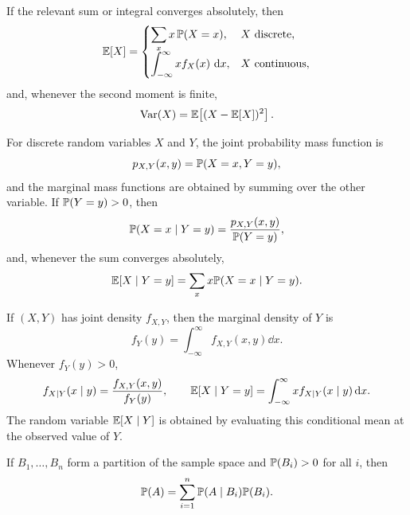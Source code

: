     \begin{definition}
        If the relevant sum or integral converges absolutely, then
        \[
            \mathbb{E}[X]
            =
            \begin{cases}
                \displaystyle\sum_x x\,\mathbb{P}(X=x), & X\text{ discrete},\\[1mm]
                \displaystyle\int_{-\infty}^{\infty}x f_X(x)\,\mathop{}\!\mathrm{d} x,
                & X\text{ continuous},
            \end{cases}
        \]
        and, whenever the second moment is finite,
        \[
            \operatorname{Var}(X)=\mathbb{E}\!\left[(X-\mathbb{E}[X])^2\right].
        \]
    \end{definition}

    \begin{definition}
        For discrete random variables $X$ and $Y$, the joint probability mass
        function is
        \[
            p_{X,Y}(x,y)=\mathbb{P}(X=x,Y=y),
        \]
        and the marginal mass functions are obtained by summing over the other
        variable. If $\mathbb{P}(Y=y)>0$, then
        \[
            \mathbb{P}(X=x\mid Y=y)
            =
            \frac{p_{X,Y}(x,y)}{\mathbb{P}(Y=y)},
        \]
        and, whenever the sum converges absolutely,
        \[
            \mathbb{E}[X\mid Y=y]
            =
            \sum_x x\mathbb{P}(X=x\mid Y=y).
        \]

        If $(X,Y)$ has joint density $f_{X,Y}$, then the marginal density of
        $Y$ is
        \[
            f_Y(y)=\int_{-\infty}^{\infty}f_{X,Y}(x,y)\dd x.
        \]
        Whenever $f_Y(y)>0$,
        \[
            f_{X\mid Y}(x\mid y)
            =
            \frac{f_{X,Y}(x,y)}{f_Y(y)},
            \qquad
            \mathbb{E}[X\mid Y=y]
            =
            \int_{-\infty}^{\infty}x f_{X\mid Y}(x\mid y)\mathop{}\!\mathrm{d} x.
        \]
        The random variable $\mathbb{E}[X\mid Y]$ is obtained by evaluating this
        conditional mean at the observed value of $Y$.
    \end{definition}

    \begin{theorem}
        If $B_1,\dots,B_n$ form a partition of the sample space and
        $\mathbb{P}(B_i)>0$ for all $i$, then
        \[
            \mathbb{P}(A)
            =
            \sum_{i=1}^{n}\mathbb{P}(A\mid B_i)\mathbb{P}(B_i).
        \]
    \end{theorem}


